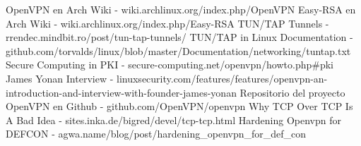 \documentclass[a4paper, 11pt, titlepage]{article}
\begin{document}
\newpage
\begin{thebibliography}{X}
    \bibitem{} OpenVPN en Arch Wiki - wiki.archlinux.org/index.php/OpenVPN
    \bibitem{} Easy-RSA en Arch Wiki - wiki.archlinux.org/index.php/Easy-RSA
    \bibitem{} TUN/TAP Tunnels - rrendec.mindbit.ro/post/tun-tap-tunnels/
    \bibitem{} TUN/TAP in Linux Documentation - github.com/torvalds/linux/blob/master/Documentation/networking/tuntap.txt
    \bibitem{} Secure Computing in PKI - secure-computing.net/openvpn/howto.php\#pki
    \bibitem{} James Yonan Interview - linuxsecurity.com/features/features/openvpn-an-introduction-and-interview-with-founder-james-yonan
    \bibitem{} Repositorio del proyecto OpenVPN en Github - github.com/OpenVPN/openvpn
    \bibitem{} Why TCP Over TCP Is A Bad Idea - sites.inka.de/bigred/devel/tcp-tcp.html
    \bibitem{} Hardening Openvpn for DEFCON - agwa.name/blog/post/hardening\_openvpn\_for\_def\_con
\end{thebibliography}
\end{document}
